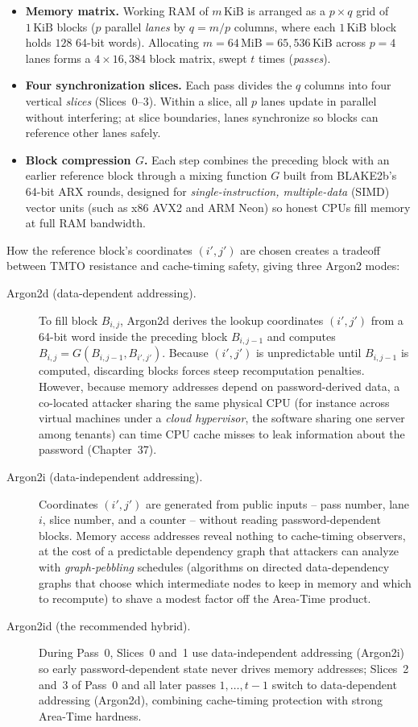 \begin{itemize}
  \item \textbf{Memory matrix.} Working RAM of $m\,\text{KiB}$ is arranged as a $p \times q$ grid of $1\,\text{KiB}$ blocks ($p$ parallel \emph{lanes} by $q = m/p$ columns, where each $1\,\text{KiB}$ block holds $128$ 64-bit words). Allocating $m = 64\,\text{MiB} = 65{,}536\,\text{KiB}$ across $p = 4$ lanes forms a $4 \times 16{,}384$ block matrix, swept $t$ times (\emph{passes}).
  \item \textbf{Four synchronization slices.} Each pass divides the $q$ columns into four vertical \emph{slices} (Slices~0--3). Within a slice, all $p$ lanes update in parallel without interfering; at slice boundaries, lanes synchronize so blocks can reference other lanes safely.
  \item \textbf{Block compression $G$.} Each step combines the preceding block with an earlier reference block through a mixing function $G$ built from BLAKE2b's 64-bit ARX rounds, designed for \emph{single-instruction, multiple-data} (SIMD) vector units (such as x86 AVX2 and ARM Neon) so honest CPUs fill memory at full RAM bandwidth.
\end{itemize}

How the reference block's coordinates $(i', j')$ are chosen creates a tradeoff between TMTO resistance and cache-timing safety, giving three Argon2 modes:

\begin{description}
  \item[Argon2d (data-dependent addressing).] To fill block $B_{i,j}$, Argon2d derives the lookup coordinates $(i', j')$ from a 64-bit word inside the preceding block $B_{i,j-1}$ and computes $B_{i,j} = G(B_{i,j-1}, B_{i',j'})$. Because $(i', j')$ is unpredictable until $B_{i,j-1}$ is computed, discarding blocks forces steep recomputation penalties. However, because memory addresses depend on password-derived data, a co-located attacker sharing the same physical CPU (for instance across virtual machines under a \emph{cloud hypervisor}, the software sharing one server among tenants) can time CPU cache misses to leak information about the password (Chapter~37).
  \item[Argon2i (data-independent addressing).] Coordinates $(i', j')$ are generated from public inputs -- pass number, lane $i$, slice number, and a counter -- without reading password-dependent blocks. Memory access addresses reveal nothing to cache-timing observers, at the cost of a predictable dependency graph that attackers can analyze with \emph{graph-pebbling} schedules (algorithms on directed data-dependency graphs that choose which intermediate nodes to keep in memory and which to recompute) to shave a modest factor off the Area-Time product.
  \item[Argon2id (the recommended hybrid).] During Pass~0, Slices~0 and~1 use data-independent addressing (Argon2i) so early password-dependent state never drives memory addresses; Slices~2 and~3 of Pass~0 and all later passes $1, \dots, t-1$ switch to data-dependent addressing (Argon2d), combining cache-timing protection with strong Area-Time hardness.
\end{description}


